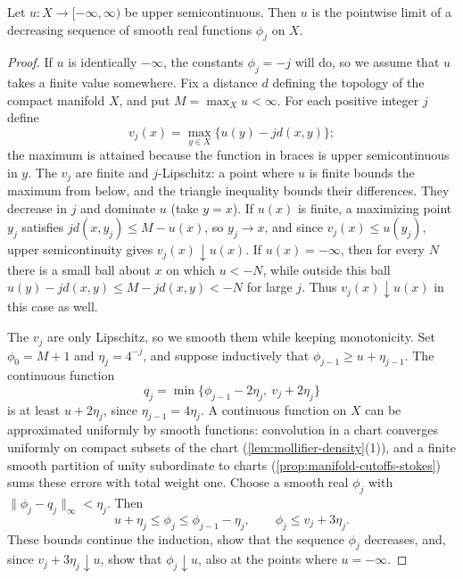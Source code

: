 \begin{lemma}\label{lem:smooth-decreasing-usc-approximation}
Let $u\colon X\to[-\infty,\infty)$ be upper semicontinuous. Then $u$ is the pointwise limit of a decreasing sequence of smooth real functions $\phi_j$ on $X$.
\end{lemma}
\begin{proof}
If $u$ is identically $-\infty$, the constants $\phi_j=-j$ will do, so we assume that $u$ takes a finite value somewhere. Fix a distance $d$ defining the topology of the compact manifold $X$, and put $M=\max_Xu<\infty$. For each positive integer $j$ define
\[
 v_j(x)=\max_{y\in X}\{u(y)-j d(x,y)\};
\]
the maximum is attained because the function in braces is upper semicontinuous in $y$. The $v_j$ are finite and $j$-Lipschitz: a point where $u$ is finite bounds the maximum from below, and the triangle inequality bounds their differences. They decrease in $j$ and dominate $u$ (take $y=x$). If $u(x)$ is finite, a maximizing point $y_j$ satisfies $jd(x,y_j)\leq M-u(x)$, so $y_j\to x$, and since $v_j(x)\leq u(y_j)$, upper semicontinuity gives $v_j(x)\downarrow u(x)$. If $u(x)=-\infty$, then for every $N$ there is a small ball about $x$ on which $u<-N$, while outside this ball $u(y)-jd(x,y)\leq M-jd(x,y)<-N$ for large $j$. Thus $v_j(x)\downarrow u(x)$ in this case as well.

The $v_j$ are only Lipschitz, so we smooth them while keeping monotonicity. Set $\phi_0=M+1$ and $\eta_j=4^{-j}$, and suppose inductively that $\phi_{j-1}\geq u+\eta_{j-1}$. The continuous function
\[
 q_j=\min\{\phi_{j-1}-2\eta_j,\ v_j+2\eta_j\}
\]
is at least $u+2\eta_j$, since $\eta_{j-1}=4\eta_j$. A continuous function on $X$ can be approximated uniformly by smooth functions: convolution in a chart converges uniformly on compact subsets of the chart (\cref{lem:mollifier-density}(1)), and a finite smooth partition of unity subordinate to charts (\cref{prop:manifold-cutoffs-stokes}) sums these errors with total weight one. Choose a smooth real $\phi_j$ with $\|\phi_j-q_j\|_\infty<\eta_j$. Then
\[
 u+\eta_j\leq\phi_j\leq\phi_{j-1}-\eta_j,
 \qquad \phi_j\leq v_j+3\eta_j.
\]
These bounds continue the induction, show that the sequence $\phi_j$ decreases, and, since $v_j+3\eta_j\downarrow u$, show that $\phi_j\downarrow u$, also at the points where $u=-\infty$.
\end{proof}

